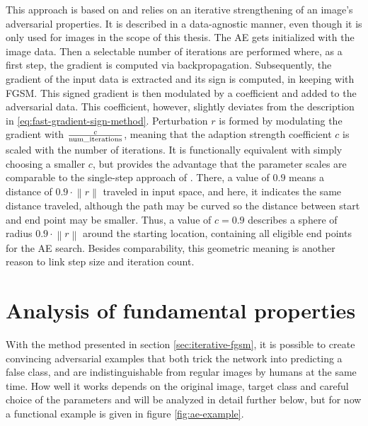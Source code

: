 \documentclass[11pt, a4paper]{article}
\newcommand{\norm}[1]{\left\lVert#1\right\rVert}
\begin{document}
This approach is based on \cite{how-to-trick-neural-network-panda-to-vulture} and relies on an iterative strengthening of an image's adversarial properties. It is described in a data-agnostic manner, even though it is only used for images in the scope of this thesis. The AE gets initialized with the image data. Then a selectable number of iterations are performed where, as a first step, the gradient is computed via backpropagation. Subsequently, the gradient of the input data is extracted and its sign is computed, in keeping with FGSM. This signed gradient is then modulated by a coefficient and added to the adversarial data. This coefficient, however, slightly deviates from the description in \eqref{eq:fast-gradient-sign-method}. Perturbation $r$ is formed by modulating the gradient with $\frac{c}{\text{num\_iterations}}$, meaning that the adaption strength coefficient $c$ is scaled with the number of iterations. It is functionally equivalent with simply choosing a smaller $c$, but provides the advantage that the parameter scales are comparable to the single-step approach of \cite{explaining-and-harnessing-adversarial-examples}. There, a value of $0.9$ means a distance of $0.9 \cdot \norm{r}$ traveled in input space, and here, it indicates the same distance traveled, although the path may be curved so the distance between start and end point may be smaller. Thus, a value of $c = 0.9$ describes a sphere of radius $0.9 \cdot \norm{r}$ around the starting location, containing all eligible end points for the AE search. Besides comparability, this geometric meaning is another reason to link step size and iteration count.











\section{Analysis of fundamental properties}
\label{sec:fundamental-properties}
With the method presented in section \ref{sec:iterative-fgsm}, it is possible to create convincing adversarial examples that both trick the network into predicting a false class, and are indistinguishable from regular images by humans at the same time. How well it works depends on the original image, target class and careful choice of the parameters and will be analyzed in detail further below, but for now a functional example is given in figure \ref{fig:ae-example}.
\end{document}
